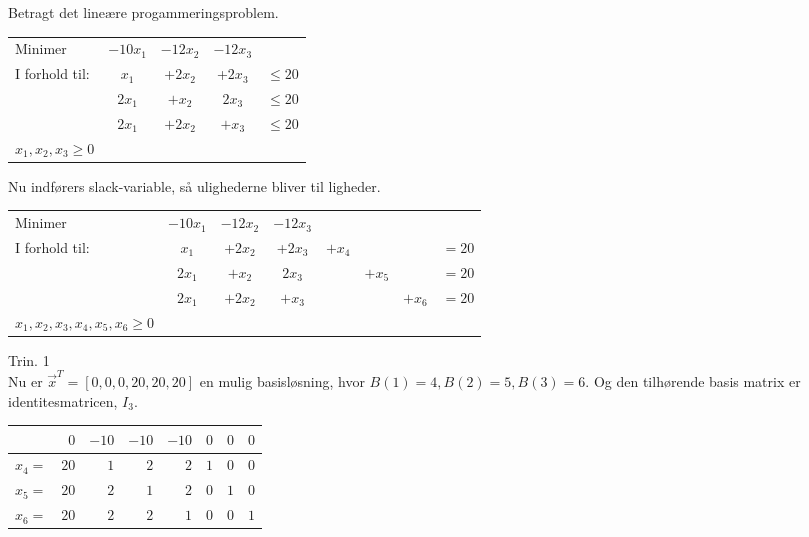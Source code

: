 \begin{eks}
Betragt det lineære progammeringsproblem. 
\begin{center}
\begin{tabular}{ l c c  c  r }
Minimer &$-10x_1$&$-12x_2$ & $-12x_3$&\\
I forhold til: &$x_1$&+$2x_2 $&+$2x_3$ & $\leq 20$\\
&$2x_1$& $+x_2$& $2x_3$ & $\leq 20$\\
&$2x_1$&$+2x_2$&$+x_3$&$\leq 20$\\
$x_1,x_2,x_3\geq 0$
\end{tabular}
\end{center}

Nu indførers slack-variable, så ulighederne bliver til ligheder. 
\begin{center}
\begin{tabular}{ l c c  c c c c r }
Minimer &$-10x_1$&$-12x_2$ & $-12x_3$&&&\\
I forhold til: &$x_1$&+$2x_2 $&+$2x_3$ &$+x_4$&& &$=20$\\
&$2x_1$& $+x_2$& $2x_3$ & & $+x_5$ &&$=20$\\
&$2x_1$&$+2x_2$&$+x_3$&&&$+x_6$&$=20$\\
$x_1,x_2,x_3,x_4,x_5,x_6\geq 0$
\end{tabular}
\end{center}

Trin. 1\\
Nu er $\vec{x}^T=[0,0,0,20,20,20]$ en mulig basisløsning, hvor $B(1)=4,B(2)=5,B(3)=6$. Og den tilhørende basis matrix er identitesmatricen, $I_3$. 
\begin{center}
\begin{tabular}{r| r|r r r r r r|}
  \hline	
  &$0$&$-10$ &$-10$&$-10$&$0$&$0$&$0$\\ \hline	
  $x_4=$&$20$&$1$&$2$&$2$&$1$&$0$&$0$\\	
  $x_5=$&$20$&$2$&$1$&$2$&$0$&$1$&$0$\\
  $x_6=$&$20$&$2$&$2$&$1$&$0$&$0$&$1$\\
   \hline
\end{tabular}
\end{center}


\end{eks}
